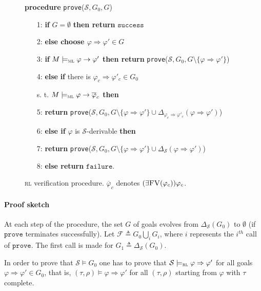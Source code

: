 \documentclass[conference]{IEEEtran}
\newcommand{\eqbydef}{\triangleq}
\newcommand{\F}{\mathcal{F}}
\renewcommand{\S}{\mathcal{S}}
\newcommand{\failure}{\mathtt{failure}}
\newcommand{\success}{\mathtt{success}}
\newcommand{\Ra}{\Rightarrow}
\newcommand{\FreeVars}{\mathit{\textsc{FV}}}
\renewcommand{\implies}{\rightarrow}
\newcommand{\ML}{\textsc{ml}\xspace}
\newcommand{\RL}{\textsc{rl}\xspace}
\newcommand{\rrule}[2]{{#1} \Ra{#2}}
\newcommand{\rarule}[2]{{#1} \Ra{#2}}
\newcommand{\modelsml}{\models_\ML}
\newcommand{\modelsrl}{\models_\RL}
\begin{document}
\begin{figure}[t]
\small
\textbf{procedure} \texttt{prove}($\S,  G_0, G$)  
\begin{itemize}
\item[1:] \textbf{if} $G = \emptyset$ \textbf{then return} $\success$ 
\item[2:] \quad \textbf{\textbf{else} \textbf{choose} $\rarule{\varphi}{\varphi'} \in G$}  
\item[3:] \quad \quad \textbf{if} $M\modelsml \varphi \implies \varphi'$ \textbf{then return} \texttt{prove}($\S, G_0, G\setminus \{ \rarule{\varphi}{\varphi'} \}$)  
\item[4:] \quad \quad \textbf{else} \textbf{if} there is $ \rarule{\varphi_c}{\varphi'_c} \in G_0$
\item[] \quad\quad\quad\quad\quad\quad s. t. $M\modelsml\varphi\implies \overline{\varphi}_c$ 
\textbf{then}   
\item[5:] \qquad \qquad
\textbf{return} \texttt{prove}($\S,G_0,G\setminus \{ \rarule{\varphi}{\varphi'} \}  \cup \Delta_{\rrule{\varphi_c}{\varphi'_c}}(\rarule{\varphi}{\varphi'}) $) 
\item[6:] \quad \quad \textbf{else if}  $\varphi$ is $\S$-derivable \textbf{then}
\item[7:] \qquad \qquad
\textbf{return} \texttt{prove}($\S,G_0,G\setminus \{ \rarule{\varphi}{\varphi'}  \} \cup\Delta_{\S}(\rarule{\varphi}{\varphi'}) $)
\item[8:] \quad \quad \textbf{else return} $\failure$.
\vspace{-2ex}
\end{itemize}
\caption{\label{fig:prove} \RL verification procedure.  $\overline{\varphi}_c$ denotes $(\exists\FreeVars(\varphi_c))\varphi_c$.}
\end{figure}


\paragraph{Proof sketch}
At each step of the procedure, the set $G$ of goals evolves from $\Delta_\S(G_0)$ to $\emptyset$ (if $\texttt{prove}$ terminates successfully). 
Let $\F \eqbydef G_0 \bigcup_{i}G_i$, where $i$ represents the $i^{\mathit{th}}$ call of $\texttt{prove}$.
The first call is made for $G_1 \eqbydef \Delta_\S(G_0)$.

In order to prove that $\S\models G_0$ one has to prove that $\S\modelsrl\rrule{\varphi}{\varphi'}$ for all goals $\rrule{\varphi}{\varphi'} \in G_0$, that is, $(\tau, \rho)\models\rrule{\varphi}{\varphi'}$ for all $(\tau, \rho)$ starting from $\varphi$ with $\tau$ complete.
\end{document}
